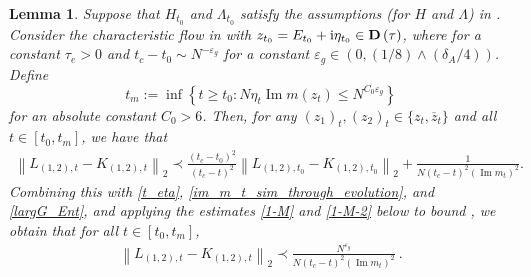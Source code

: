 \documentclass[10pt,reqno]{amsart}
\numberwithin{equation}{section}
\numberwithin{figure}{section}
\theoremstyle{plain} %
\newtheorem{lemma}[theorem]{Lemma}
\theoremstyle{definition} %
\newcommand{\wh}{\widehat}
\newcommand{\ii}{\mathrm{i}}
\renewcommand{\leq}{\le}
\renewcommand{\geq}{\ge}
\renewcommand{\epsilon}{\varepsilon}
\renewcommand{\bar}{\overline}
\newcommand{\p}[1]{({#1})}
\newcommand{\pa}[1]{\left({#1}\right)}
\newcommand{\qa}[1]{\left[{#1}\right]}
\newcommand{\ha}[1]{\left\{{#1}\right\}}
\DeclareMathOperator{\im}{\mathrm{Im}}
\numberwithin{equation}{section}
\begin{document}
\begin{lemma}\label{lem_flow_1}
Suppose that $H_{t_0}$ and $ \Lambda_{t_0}$ satisfy the assumptions (for $H$ and $\Lambda$) in . Consider the characteristic flow in   with $z_{t_0}=E_{t_0}+\ii \eta_{t_0} \in \bf D\pa{\tau}$, where  for a constant $\tau_e>0$ and $t_c-t_0 \sim N^{-\epsilon_g}$ for a constant $\varepsilon_g\in \pa{0,\p{1/8}\wedge \p{\delta_A/4}}$. Define 
\[t_m:=\inf\ha{t\geq t_0: N\eta_t\im m\pa{z_t}\leq N^{C_0\varepsilon_g}}\] 
for an absolute constant $C_0>6$. Then, for any $(z_1)_t, (z_2)_t\in \{z_t, \bar z_t\}$ and all $t\in [t_0,t_m]$, we have that
    \begin{equation}\label{flow_1_result}
        \begin{aligned}
            \left\|L_{(1,2), t}-K_{(1,2), t}\right\|_2 \prec \frac{\left(t_c-t_0\right)^2}{\left(t_c-t\right)^2}\left\|L_{(1,2), t_0}-K_{(1,2), t_0}\right\|_2+\frac{1}{N\left(t_c-t\right)^2\left(\operatorname{Im} m_t\right)^2}.
        \end{aligned}
    \end{equation}
Combining this with \eqref{t_eta}, \eqref{im_m_t_sim_through_evolution}, and \eqref{largG_Ent}, and applying the estimates \eqref{1-M} and \eqref{1-M-2} below to bound \smash{$\|\p{1-\wh M_{\pa{1,2}}}^{-1}\|$}, we obtain that for all $t\in\qa{t_0,t_m}$,
    \begin{equation}\label{flow_1_result_2}
        \begin{aligned}
            \left\|L_{(1,2), t}-K_{(1,2), t}\right\|_2 \prec \frac{N^{\epsilon_g}}{N\left(t_c-t\right)^2\left(\operatorname{Im} m_t\right)^2}\ .
        \end{aligned}
    \end{equation}
\end{lemma}
\end{document}
